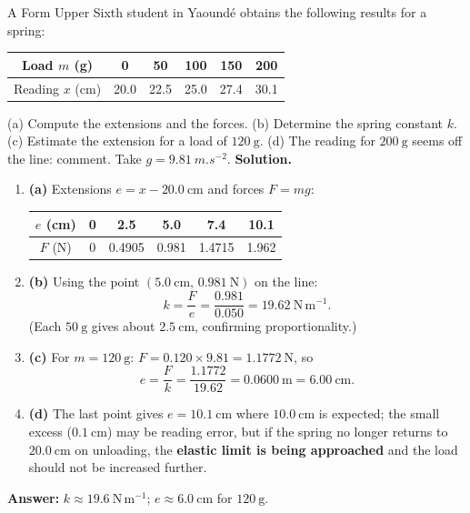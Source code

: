 \documentclass[11pt]{article}
\begin{document}
\begin{exoresolu}
A Form Upper Sixth student in Yaoundé obtains the following results for a spring:
\begin{center}
\begin{tabular}{|c|ccccc|}
\hline
\rowcolor{popblueL} Load $m$ (g) & 0 & 50 & 100 & 150 & 200 \\
\hline
Reading $x$ (cm) & 20.0 & 22.5 & 25.0 & 27.4 & 30.1 \\
\hline
\end{tabular}
\end{center}
(a) Compute the extensions and the forces. (b) Determine the spring constant $k$. (c) Estimate the extension for a load of $120\ \mathrm{g}$. (d) The reading for $200\ \mathrm{g}$ seems off the line: comment. Take $g=\SI{9.81}{m.s^{-2}}$.
\tcblower
\textbf{Solution.}
\begin{enumerate}
\item \textbf{(a)} Extensions $e=x-20.0\ \mathrm{cm}$ and forces $F=mg$:
\begin{center}
\begin{tabular}{|c|ccccc|}
\hline
\rowcolor{popblueL} $e$ (cm) & 0 & 2.5 & 5.0 & 7.4 & 10.1 \\
\hline
$F$ (N) & 0 & 0.4905 & 0.981 & 1.4715 & 1.962 \\
\hline
\end{tabular}
\end{center}
\item \textbf{(b)} Using the point $(5.0\ \mathrm{cm},\,0.981\ \mathrm{N})$ on the line:
\[ k=\frac{F}{e}=\frac{0.981}{0.050}=19.62\ \mathrm{N\,m^{-1}}. \]
(Each $50\ \mathrm{g}$ gives about $2.5\ \mathrm{cm}$, confirming proportionality.)
\item \textbf{(c)} For $m=120\ \mathrm{g}$: $F=0.120\times9.81=1.1772\ \mathrm{N}$, so
\[ e=\frac{F}{k}=\frac{1.1772}{19.62}=0.0600\ \mathrm{m}=6.00\ \mathrm{cm}. \]
\item \textbf{(d)} The last point gives $e=10.1\ \mathrm{cm}$ where $10.0\ \mathrm{cm}$ is expected; the small excess ($0.1\ \mathrm{cm}$) may be reading error, but if the spring no longer returns to $20.0\ \mathrm{cm}$ on unloading, the \textbf{elastic limit is being approached} and the load should not be increased further.
\end{enumerate}
\textbf{Answer:} $k\approx 19.6\ \mathrm{N\,m^{-1}}$; $e\approx 6.0\ \mathrm{cm}$ for $120\ \mathrm{g}$.
\end{exoresolu}
\end{document}
